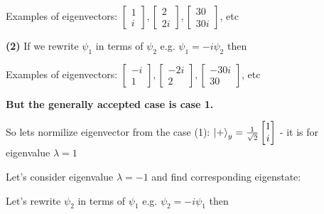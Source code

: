 \documentclass{article}
\begin{document}
Examples of eigenvectors: $
\begin{bmatrix}
1 \\ i
\end{bmatrix},
\begin{bmatrix}
2 \\ 2i
\end{bmatrix},
\begin{bmatrix}
30 \\ 30i
\end{bmatrix}
$, etc

\textbf{(2)} If we rewrite $\psi_1$ in terms of $\psi_2$ e.g. $\psi_1 = -i \psi_2$ then


Examples of eigenvectors: $
\begin{bmatrix}
-i \\ 1
\end{bmatrix},
\begin{bmatrix}
-2i \\ 2
\end{bmatrix},
\begin{bmatrix}
-30i \\ 30
\end{bmatrix}
$, etc

\textbf{But the generally accepted case is case 1.}

So lets normilize eigenvector from the case (1): $
\ket{+}_y =  
\frac{1}{\sqrt{2}}
\begin{bmatrix}
1 \\ i
\end{bmatrix}
$ - it is for eigenvalue $\lambda = 1$


Let’s consider eigenvalue $\lambda = -1$ and find corresponding eigenstate:






Let's rewrite $\psi_2$ in terms of $\psi_1$ e.g. $\psi_2 = -i \psi_1$ then

\end{document}
